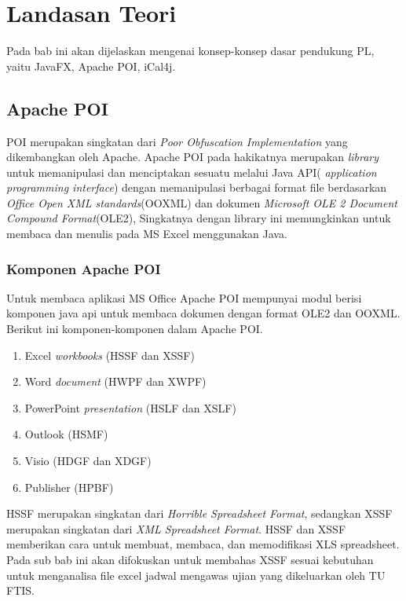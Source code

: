 \chapter{Landasan Teori}
\label{chap:teori}
Pada bab ini akan dijelaskan mengenai konsep-konsep dasar pendukung PL, yaitu JavaFX, Apache POI, iCal4j.

\section{Apache POI}
\label{sec:apache} 

POI merupakan singkatan dari \textit{Poor Obfuscation Implementation} yang dikembangkan oleh Apache. Apache POI pada hakikatnya merupakan \textit{library} untuk memanipulasi dan menciptakan sesuatu melalui Java API( \textit{application programming interface}) dengan memanipulasi berbagai format file berdasarkan \textit{Office Open XML standards}(OOXML) dan dokumen \textit{Microsoft OLE 2 Document Compound Format}(OLE2), Singkatnya dengan library ini memungkinkan untuk membaca dan menulis pada MS Excel menggunakan Java.\cite{apachepoi} \\


\subsection{Komponen Apache POI}
\label{subs:komponen} 
Untuk membaca aplikasi MS Office Apache POI mempunyai modul berisi komponen java api untuk membaca dokumen dengan format OLE2 dan OOXML. Berikut ini komponen-komponen dalam Apache POI.\cite{apachepoi}  

\begin{enumerate}
	\item Excel \textit{workbooks} (HSSF dan XSSF)
	\item Word \textit{document} (HWPF dan XWPF)
	\item PowerPoint \textit{presentation} (HSLF dan XSLF)
	\item Outlook (HSMF)
	\item Visio (HDGF dan XDGF)
	\item Publisher (HPBF)
\end{enumerate}

HSSF merupakan singkatan dari \textit{Horrible Spreadsheet Format}, sedangkan XSSF merupakan singkatan dari \textit{XML Spreadsheet Format}. HSSF dan XSSF memberikan cara untuk membuat, membaca, dan memodifikasi XLS spreadsheet. Pada sub bab ini akan difokuskan untuk membahas XSSF sesuai kebutuhan untuk menganalisa file excel jadwal mengawas ujian yang dikeluarkan oleh TU FTIS.\cite{apachepoi}


